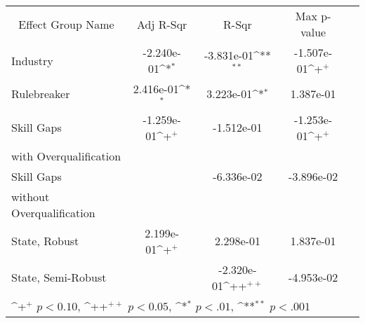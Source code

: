 {
\def\sym#1{\ifmmode^{#1}\else\(^{#1}\)\fi}
\begin{tabular}{l*{4}{c}}
    \toprule
    \multicolumn{1}{c}{Effect Group Name} & \multicolumn{1}{c}{Adj R-Sqr} & \multicolumn{1}{c}{R-Sqr} & \multicolumn{1}{c}{Max p-value} \\
    Industry                              & -2.240e-01\sym{*}             & -3.831e-01\sym{**}        & -1.507e-01\sym{+}               \\
    \addlinespace
    Rulebreaker                           & 2.416e-01\sym{*}              & 3.223e-01\sym{*}          & 1.387e-01                       \\
    \addlinespace
    Skill Gaps                            & -1.259e-01\sym{+}             & -1.512e-01                & -1.253e-01\sym{+}               \\
    with Overqualification                &                               &                           &                                 \\
    \addlinespace
    Skill Gaps                            &                               & -6.336e-02                & -3.896e-02                      \\
    without Overqualification             &                               &                           &                                 \\
    \addlinespace
    State, Robust                         & 2.199e-01\sym{+}              & 2.298e-01                 & 1.837e-01                       \\
    \addlinespace
    State, Semi-Robust                    &                               & -2.320e-01\sym{++}        & -4.953e-02                      \\
    \bottomrule
    \multicolumn{4}{l}{\footnotesize \sym{+} \(p<0.10\), \sym{++} \(p<0.05\), \sym{*} \(p<.01\), \sym{**} \(p<.001\)}                   \\
\end{tabular}
}
